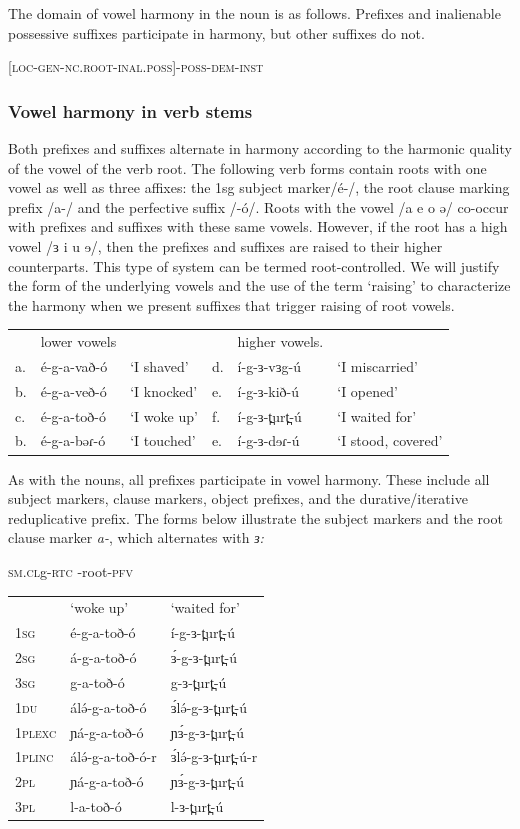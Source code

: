 The domain of vowel harmony in the noun is as follows. Prefixes and inalienable possessive suffixes participate in harmony, but other suffixes do not. 

\ea \textsc{[loc-gen-nc.root-inal.poss]-poss-dem-inst}
\z


\subsubsection{Vowel harmony in verb stems}
Both prefixes and suffixes alternate in harmony according to the harmonic quality of the vowel of the verb root. The following verb forms contain roots with one vowel as well as three affixes: the 1sg subject marker/é-/, the root clause marking prefix /a-/ and the perfective suffix /-ó/.  Roots with the vowel /a e o ə/ co-occur with prefixes and suffixes with these same vowels. However, if the root has a high vowel /ɜ i u ɘ/, then the prefixes and suffixes are raised to their higher counterparts. This type of system can be termed root-controlled. We will justify the form of the underlying vowels and the use of the term ‘raising’ to characterize the harmony when we present suffixes that trigger raising of root vowels. 

\ea
\begin{tabular}[t]{llllll}
&	lower vowels	&		&	& higher vowels.\\
a.&	é-g-a-vað-ó		&	‘I shaved’	&	d.	&	í-g-ɜ-vɜg-ú	&	‘I miscarried’\\
b.&	é-g-a-veð-ó		&	‘I knocked’	&	e.	&	í-g-ɜ-kið-ú	&	‘I opened’\\
c.&	é-g-a-toð-ó		&	‘I woke up’	&	f.	&	í-g-ɜ-t̪urt̪-ú&	‘I waited for’\\
b.&	é-g-a-bəɾ-ó 	&	‘I touched’	&	e.	&	í-g-ɜ-dɘɾ-ú &	‘I stood, covered’\\
\end{tabular}
\z

As with the nouns, all prefixes participate in vowel harmony. These include all subject markers, clause markers, object prefixes, and the durative/iterative reduplicative prefix. The forms below illustrate the subject markers and the root clause marker \textit{a-}, which alternates with \textit{ɜ:}

\ea \textsc{sm.cl}g-\textsc{rtc} -root-\textsc{pfv}\\
\begin{tabular}[t]{lll}
&	‘woke up’	&	‘waited for’\\
1\textsc{sg}	&	é-g-a-toð-ó	&	í-g-ɜ-t̪urt̪-ú\\
2\textsc{sg}	&	á-g-a-toð-ó	&	ɜ́-g-ɜ-t̪urt̪-ú\\
3\textsc{sg}	&	g-a-toð-ó	&	g-ɜ-t̪urt̪-ú\\
1\textsc{du}	&	álə́-g-a-toð-ó	&	ɜ́lə́-g-ɜ-t̪urt̪-ú\\
1\textsc{plexc}	&	ɲá-g-a-toð-ó	&	ɲɜ́-g-ɜ-t̪urt̪-ú\\
1\textsc{plinc}	&	álə́-g-a-toð-ó-r	&	ɜ́lə́-g-ɜ-t̪urt̪-ú-r\\
2\textsc{pl}	&	ɲá-g-a-toð-ó	&	ɲɜ́-g-ɜ-t̪urt̪-ú\\
3\textsc{pl}	&	l-a-toð-ó	&	l-ɜ-t̪urt̪-ú\\
\end{tabular}
\z

